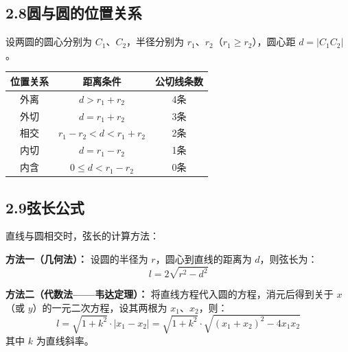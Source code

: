 \documentclass[12pt, a4paper]{ctexart}
\begin{document}
\subsection*{2.8\quad 圆与圆的位置关系}

设两圆的圆心分别为 $C_1$、$C_2$，半径分别为 $r_1$、$r_2$（$r_1 \geqslant r_2$），圆心距 $d = |C_1C_2|$。

\begin{knowledgebox}[圆与圆的位置关系]
\begin{center}
\renewcommand{\arraystretch}{1.4}
\begin{tabular}{c|c|c}
\toprule
位置关系 & 距离条件 & 公切线条数 \\
\midrule
外离 & $d > r_1 + r_2$ & 4条 \\
外切 & $d = r_1 + r_2$ & 3条 \\
相交 & $r_1 - r_2 < d < r_1 + r_2$ & 2条 \\
内切 & $d = r_1 - r_2$ & 1条 \\
内含 & $0 \leqslant d < r_1 - r_2$ & 0条 \\
\bottomrule
\end{tabular}
\end{center}
\end{knowledgebox}

\subsection*{2.9\quad 弦长公式}

\begin{knowledgebox}[弦长公式]
直线与圆相交时，弦长的计算方法：

\textbf{方法一（几何法）：}
设圆的半径为 $r$，圆心到直线的距离为 $d$，则弦长为：
\[
\boxed{l = 2\sqrt{r^2 - d^2}}
\]

\textbf{方法二（代数法——韦达定理）：}
将直线方程代入圆的方程，消元后得到关于 $x$（或 $y$）的一元二次方程，设其两根为 $x_1$、$x_2$，则：
\[
\boxed{l = \sqrt{1 + k^2} \cdot |x_1 - x_2| = \sqrt{1 + k^2} \cdot \sqrt{(x_1 + x_2)^2 - 4x_1 x_2}}
\]
其中 $k$ 为直线斜率。
\end{knowledgebox}
\end{document}
